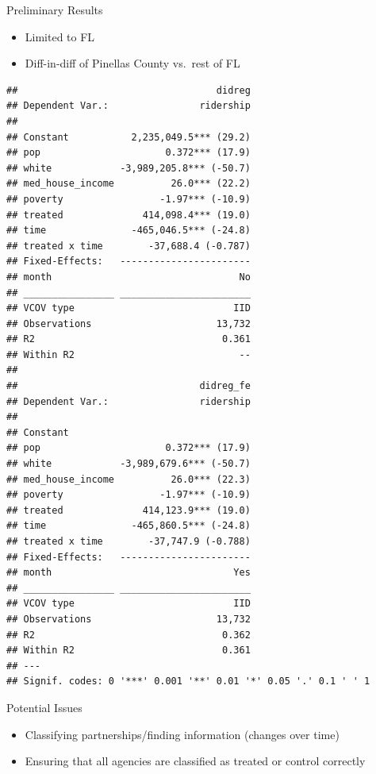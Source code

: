 \documentclass[
  ignorenonframetext,
]{beamer}
\providecommand{\tightlist}{%
  \setlength{\itemsep}{0pt}\setlength{\parskip}{0pt}}
\begin{document}
\begin{frame}[fragile]{Preliminary Results}
\protect\hypertarget{preliminary-results}{}
\begin{itemize}
\tightlist
\item
  Limited to FL
\item
  Diff-in-diff of Pinellas County vs.~rest of FL \tiny
\end{itemize}

\begin{verbatim}
##                                   didreg
## Dependent Var.:                ridership
##                                         
## Constant           2,235,049.5*** (29.2)
## pop                      0.372*** (17.9)
## white            -3,989,205.8*** (-50.7)
## med_house_income          26.0*** (22.2)
## poverty                 -1.97*** (-10.9)
## treated              414,098.4*** (19.0)
## time               -465,046.5*** (-24.8)
## treated x time        -37,688.4 (-0.787)
## Fixed-Effects:   -----------------------
## month                                 No
## ________________ _______________________
## VCOV type                            IID
## Observations                      13,732
## R2                                 0.361
## Within R2                             --
## 
##                                didreg_fe
## Dependent Var.:                ridership
##                                         
## Constant                                
## pop                      0.372*** (17.9)
## white            -3,989,679.6*** (-50.7)
## med_house_income          26.0*** (22.3)
## poverty                 -1.97*** (-10.9)
## treated              414,123.9*** (19.0)
## time               -465,860.5*** (-24.8)
## treated x time        -37,747.9 (-0.788)
## Fixed-Effects:   -----------------------
## month                                Yes
## ________________ _______________________
## VCOV type                            IID
## Observations                      13,732
## R2                                 0.362
## Within R2                          0.361
## ---
## Signif. codes: 0 '***' 0.001 '**' 0.01 '*' 0.05 '.' 0.1 ' ' 1
\end{verbatim}
\end{frame}

\begin{frame}{Potential Issues}
\protect\hypertarget{potential-issues}{}
\begin{itemize}
\tightlist
\item
  Classifying partnerships/finding information (changes over time)
\item
  Ensuring that all agencies are classified as treated or control
  correctly
\end{itemize}
\end{frame}
\end{document}
